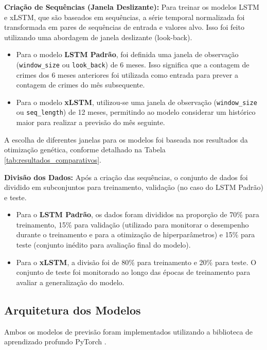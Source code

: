 \documentclass[conference]{IEEEtran}
\begin{document}
\textbf{Criação de Sequências (Janela Deslizante):} Para treinar os modelos LSTM e xLSTM, que são baseados em sequências, a série temporal normalizada foi transformada em pares de sequências de entrada e valores alvo. Isso foi feito utilizando uma abordagem de janela deslizante (look-back).
\begin{itemize}
    \item Para o modelo \textbf{LSTM Padrão}, foi definida uma janela de observação (\texttt{window\_size} ou \texttt{look\_back}) de 6 meses. Isso significa que a contagem de crimes dos 6 meses anteriores foi utilizada como entrada para prever a contagem de crimes do mês subsequente.
    \item Para o modelo \textbf{xLSTM}, utilizou-se uma janela de observação (\texttt{window\_size} ou \texttt{seq\_length}) de 12 meses, permitindo ao modelo considerar um histórico maior para realizar a previsão do mês seguinte.
\end{itemize}
A escolha de diferentes janelas para os modelos foi baseada nos resultados da otimização genética, conforme detalhado na Tabela \ref{tab:resultados_comparativos}.

\textbf{Divisão dos Dados:} Após a criação das sequências, o conjunto de dados foi dividido em subconjuntos para treinamento, validação (no caso do LSTM Padrão) e teste.
\begin{itemize}
    \item Para o \textbf{LSTM Padrão}, os dados foram divididos na proporção de 70\% para treinamento, 15\% para validação (utilizado para monitorar o desempenho durante o treinamento e para a otimização de hiperparâmetros) e 15\% para teste (conjunto inédito para avaliação final do modelo).
    \item Para o \textbf{xLSTM}, a divisão foi de 80\% para treinamento e 20\% para teste. O conjunto de teste foi monitorado ao longo das épocas de treinamento para avaliar a generalização do modelo.
\end{itemize}

\subsection{Arquitetura dos Modelos}
Ambos os modelos de previsão foram implementados utilizando a biblioteca de aprendizado profundo PyTorch \cite{b8}.
\end{document}
